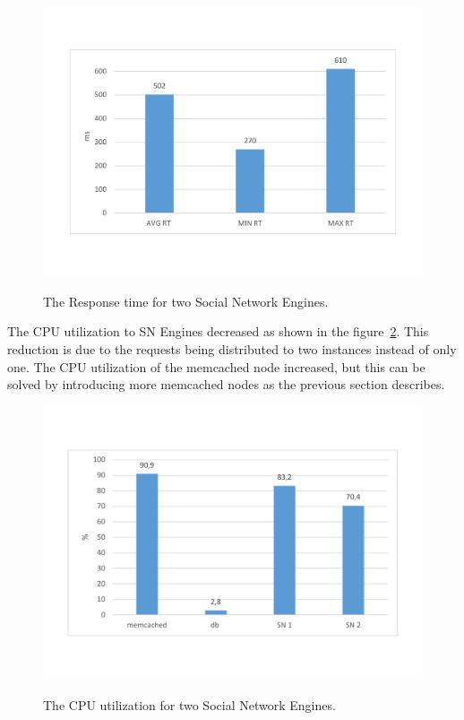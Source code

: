 \begin{figure}[h]
	\caption{The Response time for two Social Network Engines.}
	\includegraphics[width=1\textwidth,natwidth=200,natheight=150]{./fig/RT2SN.pdf}
	\centering
	\label{fig:rt2SN}
\end{figure}

The CPU utilization to SN Engines decreased as shown in the figure~\ref{fig:cpu2SNavg}. This reduction is due to the requests being distributed to two instances instead of only one. The CPU utilization of the memcached node increased, but this can be solved by introducing more memcached nodes as the previous section describes. 

\begin{figure}[h]
	\caption{The CPU utilization for two Social Network Engines.}
	\includegraphics[width=1\textwidth,natwidth=200,natheight=150]{./fig/Usage2SN.pdf}
	\centering
	\label{fig:cpu2SNavg}
\end{figure}

